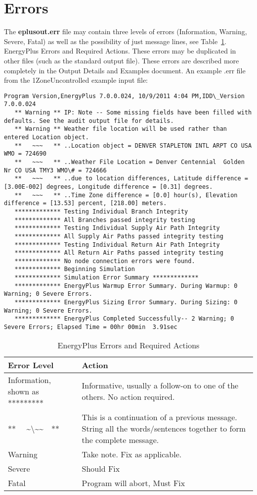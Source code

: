 \section{Errors}\label{errors}

The \textbf{eplusout.err} file may contain three levels of errors (Information, Warning, Severe, Fatal) as well as the possibility of just message lines, see Table~\ref{table:energyplus-errors-and-required-actions}. EnergyPlus Errors and Required Actions. These errors may be duplicated in other files (such as the standard output file). These errors are described more completely in the Output Details and Examples document. An example .err file from the 1ZoneUncontrolled example input file:

\begin{lstlisting}
Program Version,EnergyPlus 7.0.0.024, 10/9/2011 4:04 PM,IDD\_Version 7.0.0.024
   ** Warning ** IP: Note -- Some missing fields have been filled with defaults. See the audit output file for details.
   ** Warning ** Weather file location will be used rather than entered Location object.
   **   ~~~   ** ..Location object = DENVER STAPLETON INTL ARPT CO USA WMO = 724690
   **   ~~~   ** ..Weather File Location = Denver Centennial  Golden   Nr CO USA TMY3 WMO\# = 724666
   **   ~~~   ** ..due to location differences, Latitude difference = [3.00E-002] degrees, Longitude difference = [0.31] degrees.
   **   ~~~   ** ..Time Zone difference = [0.0] hour(s), Elevation difference = [13.53] percent, [218.00] meters.
   ************* Testing Individual Branch Integrity
   ************* All Branches passed integrity testing
   ************* Testing Individual Supply Air Path Integrity
   ************* All Supply Air Paths passed integrity testing
   ************* Testing Individual Return Air Path Integrity
   ************* All Return Air Paths passed integrity testing
   ************* No node connection errors were found.
   ************* Beginning Simulation
   ************* Simulation Error Summary *************
   ************* EnergyPlus Warmup Error Summary. During Warmup: 0 Warning; 0 Severe Errors.
   ************* EnergyPlus Sizing Error Summary. During Sizing: 0 Warning; 0 Severe Errors.
   ************* EnergyPlus Completed Successfully-- 2 Warning; 0 Severe Errors; Elapsed Time = 00hr 00min  3.91sec
\end{lstlisting}

\begin{longtable}[c]{p{1.5in}p{4.5in}}
\caption{EnergyPlus Errors and Required Actions \protect \label{table:energyplus-errors-and-required-actions}}\\
\toprule 
Error Level & Action \tabularnewline \midrule
\endhead
Information, shown as ********* & Informative, usually a follow-on to one of the others. No action required. \tabularnewline
**~~ \~{}\textbackslash\~{}\~{}~~** & This is a continuation of a previous message.~ String all the words/sentences together to form the complete message. \tabularnewline
Warning & Take note. Fix as applicable. \tabularnewline
Severe & Should Fix \tabularnewline
Fatal & Program will abort, Must Fix \tabularnewline
\bottomrule
\end{longtable}

